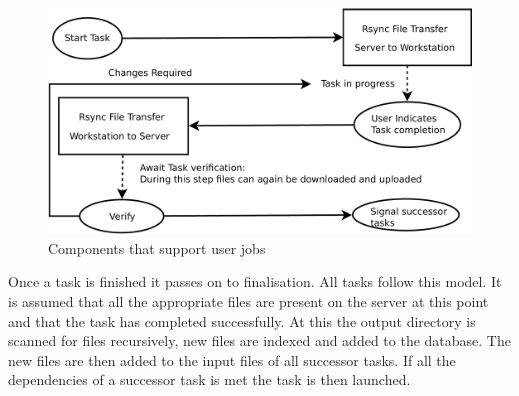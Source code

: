 \documentclass[12pt,a4paper]{report}
\begin{document}
\begin{figure}[!h]
    \begin{center}
        \includegraphics[scale=0.4]{figures/user_impl2.pdf}
    \end{center}
    \caption{Components that support user jobs}
    \label{user_task_impl2}
\end{figure}
    Once a task is finished it passes on to finalisation. All tasks follow this model. It
    is assumed that all the appropriate files are present on the server at this point and
    that the task has completed successfully. At this the output directory is scanned for
    files recursively, new files are indexed and added to the database. The new files are then
    added to the input files of all successor tasks. If all the dependencies of a successor
    task is met the task is then launched.
\end{document}
